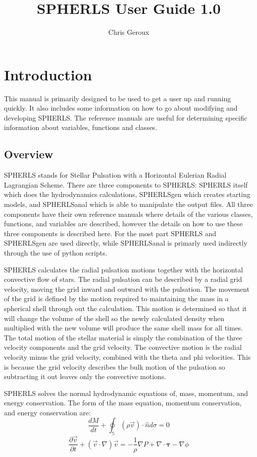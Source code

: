 \documentclass[12pt,a4paper]{book}
\title{SPHERLS User Guide 1.0}
\author{Chris Geroux}
\begin{document}
\maketitle
\chapter{Introduction}
This manual is primarily designed to be used to get a user up and running quickly. It also includes some information on how to go about modifying and developing SPHERLS. The reference manuals are useful for determining specific information about variables, functions and classes.

\section{Overview}
SPHERLS stands for Stellar Pulsation with a Horizontal Eulerian Radial Lagrangian Scheme. There are three components to SPHERLS: SPHERLS itself which does the hydrodynamics calculations, SPHERLSgen which creates starting models, and SPHERLSanal which is able to manipulate the output files. All three components have their own reference manuals where details of the various classes, functions, and variables are described, however the details on how to use these three components is described here. For the most part SPHERLS and SPHERLSgen are used directly, while SPHERLSanal is primarly used indirectly through the use of python scripts.
  
SPHERLS calculates the radial pulsation motions together with the horizontal convective flow of stars. The radial pulsation can be described by a radial grid velocity, moving the grid inward and outward with the pulsation. The movement of the grid is defined by the motion required to maintaining the mass in a spherical shell through out the calculation. This motion is determined so that it will change the volume of the shell so the newly calculated density when multiplied with the new volume will produce the same shell mass for all times. The total motion of the stellar material is simply the combination of the three velocity components and the grid velocity.  The convective motion is the radial velocity minus the grid velocity, combined with the theta and phi velocities. This is because the grid velocity describes the bulk motion of the pulsation so subtracting it out leaves only the convective motions.

SPHERLS solves the normal hydrodynamic equations of, mass, momentum, and energy conservation. The form of the mass equation, momentum conservation, and energy conservation are:
\begin{equation}
\frac{d M}{d t} + \oint_{\mathbb{S}} \left(\rho\vec v\right)\cdot\hat{n}d\sigma=0
\end{equation}
\begin{equation}
\frac{\partial \vec{v}}{\partial t}+(\vec{v}\cdot\nabla)\vec{v}=-\frac{1}{\rho}\nabla P + \nabla\cdot\mathbf{\tau}-\nabla \phi
\end{equation}
  
\end{document}
